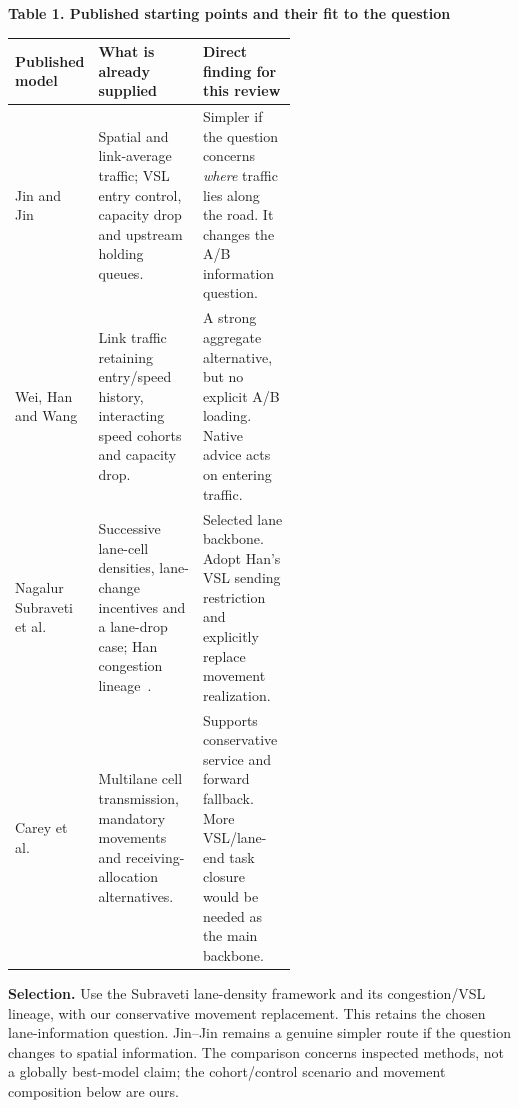 \documentclass[10pt,a4paper]{article}
\newcommand{\Jin}[1]{\textcolor{SrcJin}{#1}}
\newcommand{\Wei}[1]{\textcolor{SrcWei}{#1}}
\newcommand{\NS}[1]{\textcolor{SrcNS}{#1}}
\newcommand{\Hsix}[1]{\textcolor{SrcHan16}{#1}}
\newcommand{\Hseven}[1]{\textcolor{SrcHan17}{#1}}
\newcommand{\Carey}[1]{\textcolor{SrcCarey}{#1}}
\newcommand{\Own}[1]{\textcolor{Own}{#1}}
\newcommand{\scite}[2]{\textcolor{#1}{\cite{#2}}}
\begin{document}
\begin{center}
\textbf{Table 1. Published starting points and their fit to the question}\par
\vspace{3pt}
\begin{tabularx}{\linewidth}{@{}>{\raggedright\arraybackslash}p{0.19\linewidth}
 >{\raggedright\arraybackslash}p{0.37\linewidth}
 >{\raggedright\arraybackslash}X@{}}
\toprule
Published model & What is already supplied & Direct finding for this review\\
\midrule
\Jin{Jin and Jin}~\scite{SrcJin}{jinjin}
& Spatial and link-average traffic; VSL entry control, capacity drop and
upstream holding queues.
& Simpler if the question concerns \emph{where} traffic lies along the
road. It changes the A/B information question.\\[3pt]
\Wei{Wei, Han and Wang}~\scite{SrcWei}{wei}
& Link traffic retaining entry/speed history, interacting speed cohorts
and capacity drop.
& A strong aggregate alternative, but no explicit A/B loading. Native
advice acts on entering traffic.\\[3pt]
\NS{Nagalur Subraveti et al.}~\scite{SrcNS}{ns}
& Successive lane-cell densities, lane-change incentives and a lane-drop
case; \Hsix{Han congestion lineage}~\scite{SrcHan16}{han16}.
& Selected lane backbone. Adopt \Hseven{Han's VSL sending restriction}~\scite{SrcHan17}{han17}
and explicitly replace movement realization.\\[3pt]
\Carey{Carey et al.}~\scite{SrcCarey}{carey}
& Multilane cell transmission, mandatory movements and receiving-allocation
alternatives.
& Supports conservative service and forward fallback. More VSL/lane-end
task closure would be needed as the main backbone.\\
\bottomrule
\end{tabularx}
\end{center}

\textbf{Selection.} Use the \NS{Subraveti lane-density framework} and its
\Hsix{congestion}/\Hseven{VSL} lineage, with our \Own{conservative movement replacement}.
This retains the chosen lane-information question. Jin--Jin remains a
genuine simpler route if the question changes to spatial information.
The comparison concerns inspected methods, not a globally best-model claim;
the \Own{cohort/control scenario and movement composition} below are ours.
\end{document}

